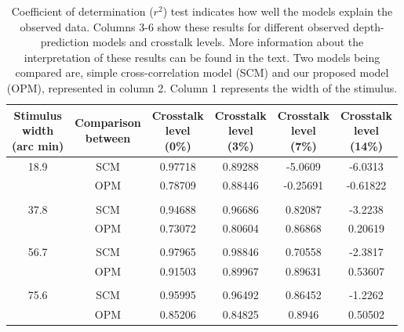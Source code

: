 \begin{table}[H]
  \begin{center}
    \caption{Coefficient of determination ($r^2$) test indicates how well the models explain the observed data. Columns 3-6 show these results for different observed depth-prediction models and crosstalk levels. More information about the interpretation of these results can be found in the text. Two models being compared are, simple cross-correlation model (SCM) and our proposed model (OPM), represented in column 2. Column 1 represents the width of the stimulus.}
    \label{tab:model_fitting_test}
    \begin{tabular}{cccccc}
      \toprule
       \specialcell{Stimulus\\width\\(arc min)} &  \specialcell{Comparison\\between\\ }  &  \specialcell{Crosstalk\\level\\(0\%)} & \specialcell{Crosstalk\\level\\(3\%)} & \specialcell{Crosstalk\\level\\(7\%)} & \specialcell{Crosstalk\\level\\(14\%)}\\
      \midrule
      18.9      & SCM & 0.97718     &       0.89288    &    -5.0609   &      -6.0313 \\
                & OPM & 0.78709     &       0.88446    &    -0.25691  &      -0.61822  \\
                & & & & \\
      37.8      & SCM & 0.94688     &       0.96686    &    0.82087   &    -3.2238\\
                & OPM & 0.73072     &       0.80604    &   0.86868    &     0.20619\\
                & & & & \\
      56.7      & SCM & 0.97965     &       0.98846    &    0.70558   &      -2.3817\\
                & OPM & 0.91503     &       0.89967    &    0.89631   &      0.53607\\
                & & & & \\
      75.6      & SCM & 0.95995     &       0.96492    &    0.86452   &      -1.2262\\
                & OPM & 0.85206     &       0.84825    &    0.8946    &      0.50502\\
      \bottomrule
    \end{tabular}
  \end{center}
\end{table}
